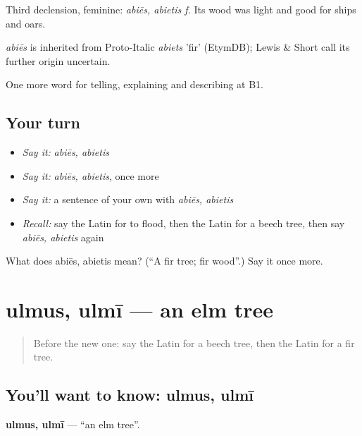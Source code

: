 Third declension, feminine: \emph{abiēs, abietis f.} Its wood was light and good for ships and oars.

\begin{cousinweb}
\emph{abiēs} is inherited from Proto-Italic \emph{abiets} 'fir' (EtymDB); Lewis \& Short call its further origin uncertain.
\end{cousinweb}

\begin{grammarlens}[title={What you've built}]
One more word for telling, explaining and describing at B1.
\end{grammarlens}

\subsection*{Your turn}
\begin{itemize}
\raggedright
  \item \emph{Say it:} \emph{abiēs, abietis}
  \item \emph{Say it:} \emph{abiēs, abietis}, once more
  \item \emph{Say it:} a sentence of your own with \emph{abiēs, abietis}
  \item \emph{Recall:} say the Latin for to flood, then the Latin for a beech tree, then say \emph{abiēs, abietis} again
\end{itemize}

\begin{tcolorbox}[breakable,colback=teal!4,colframe=teal!35!black,title={Before you move on}]
What does abiēs, abietis mean? (\textquotedblleft{}A fir tree; fir wood\textquotedblright{}.) Say it once more.
\end{tcolorbox}
\section[ulmus, ulmī]{ulmus, ulmī — an elm tree}

\label{lesson:LA-C484-ulmus}



\begin{quote}
Before the new one: say the Latin for a beech tree, then the Latin for a fir tree.
\end{quote}

\subsection*{You'll want to know: ulmus, ulmī}
\textbf{ulmus, ulmī} — \textquotedblleft{}an elm tree\textquotedblright{}.

